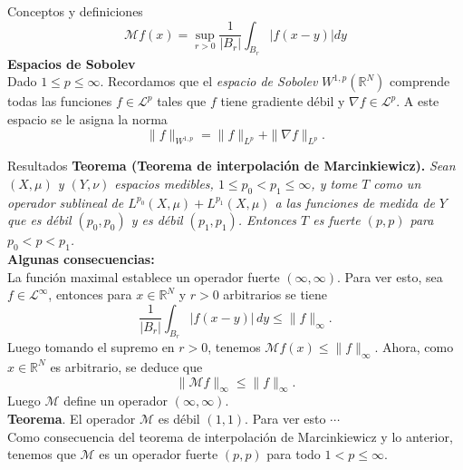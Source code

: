 \documentclass[final]{beamer}
\newlength{\colwidth}
\begin{document}
\begin{frame}[t]
\begin{columns}[t]
\begin{column}{\colwidth}
\begin{block}{Conceptos y definiciones}
			$$\mathcal{M}f(x)=\sup_{r>0}\frac{1}{|B_r|}\int_{B_r}|f(x-y)|dy$$
    \textbf{Espacios de Sobolev}\\
      Dado $1\leq p\leq \infty$. Recordamos que el \emph{espacio de Sobolev} $W^{1,p}(\mathbb{R}^N)$ comprende todas las funciones $f\in \mathcal{L}^p$ tales que $f$ tiene gradiente débil y $\nabla f\in \mathcal{L}^p$. A este espacio se le asigna la norma
          \begin{equation*}
              \|f\|_{W^{1,p}}=\|f\|_{L^p}+\|\nabla f\|_{L^p}.
          \end{equation*}
  \end{block}

  \begin{alertblock}{Resultados}
    \textbf{Teorema (Teorema de interpolación de Marcinkiewicz).} \emph{Sean $(X, \mu)$ y $(Y, \nu)$ espacios medibles, $1 \leq p_0<p_1 \leq \infty$, y tome $T$ como un operador sublineal de $L^{p_0}(X, \mu)+L^{p_1}(X, \mu)$ a las funciones de medida de $Y$ que es débil $\left(p_0, p_0\right)$ y es débil $\left(p_1, p_1\right)$. Entonces $T$ es fuerte $(p, p)$ para $p_0<p<p_1$.}\\
      \vspace{0.2cm}
      {\bf Algunas consecuencias:}\\
      La función maximal establece un operador fuerte $(\infty,\infty)$. Para ver esto, sea $f\in \mathcal{L}^{\infty}$, entonces para $x\in \mathbb{R}^N$ y $r>0$ arbitrarios se tiene
      \begin{equation*}
        \frac{1}{|B_r|}\int_{B_r} |f(x-y)|\, dy \leq \|f\|_{\infty}.
      \end{equation*}
      Luego tomando el supremo en $r>0$, tenemos $\mathcal{M}f(x)\leq \|f\|_{\infty}$. Ahora, como $x\in \mathbb{R}^N$ es arbitrario, se deduce que
      \begin{equation*}
        \|\mathcal{M}f\|_{\infty}\leq \|f\|_{\infty}.   
      \end{equation*}
      Luego $\mathcal{M}$ define un operador $(\infty,\infty)$.\\
      \vspace{0.2cm}
      {\bf Teorema}. {El operador $\mathcal{M}$ es débil $(1,1)$.} Para ver esto $\cdots$\\
      \vspace{0.2cm}
      Como consecuencia del teorema de interpolación de Marcinkiewicz y lo anterior, tenemos que $\mathcal{M}$ es un operador fuerte $(p,p)$ para todo $1<p\leq \infty$.\\

\end{alertblock}
\end{column}
\end{columns}
\end{frame}
\end{document}
